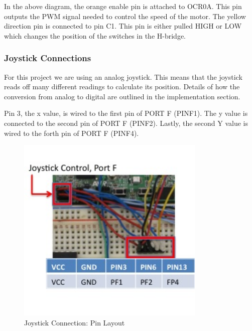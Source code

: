 In the above diagram, the orange enable pin is attached to OCR0A. This pin outputs the PWM signal needed to control the speed of the motor.  The yellow direction pin is connected to pin C1. This pin is either pulled HIGH or LOW which changes the position of the switches in the H-bridge.

\subsubsection{Joystick Connections}

For this project we are using an analog joystick. This means that  the joystick reads off many different readings to calculate its position. Details of how the conversion from analog to digital are outlined in the implementation section.

Pin 3, the x value, is wired to the first pin of PORT F (PINF1). The y value is connected to the second pin of PORT F (PINF2). Lastly, the second Y value is wired to the forth pin of PORT F (PINF4).
\begin{figure}[h]
  \begin{center}
    \includegraphics[width=90mm]{imageSources/joystickConnect.png}
  \end{center}
  \caption{Joystick Connection: Pin Layout} 
  \label{joystickConnect}
\end{figure}

